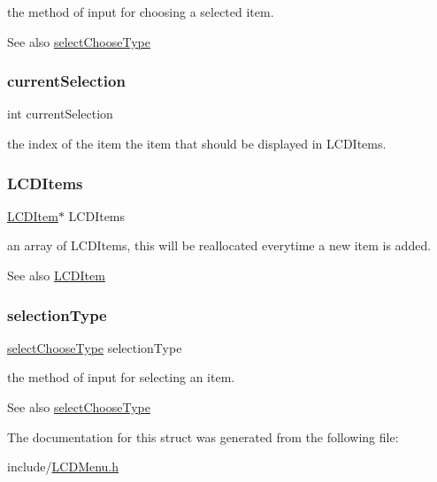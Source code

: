 the method of input for choosing a selected item.

\begin{DoxySeeAlso}{See also}
\hyperlink{_l_c_d_menu_8h_a70536180beac160b7989181e2b242de5}{select\+Choose\+Type} 
\end{DoxySeeAlso}
\hypertarget{struct_l_c_d_menu_a0e589f9054cc1ee0716a7ecda74b1352}{}\label{struct_l_c_d_menu_a0e589f9054cc1ee0716a7ecda74b1352} 
\subsubsection{\texorpdfstring{current\+Selection}{currentSelection}}
{\footnotesize\ttfamily int current\+Selection}

the index of the item the item that should be displayed in L\+C\+D\+Items. \hypertarget{struct_l_c_d_menu_af6fd93180925837331f93529da0f9ce5}{}\label{struct_l_c_d_menu_af6fd93180925837331f93529da0f9ce5} 
\subsubsection{\texorpdfstring{L\+C\+D\+Items}{LCDItems}}
{\footnotesize\ttfamily \hyperlink{struct_l_c_d_item}{L\+C\+D\+Item}$\ast$ L\+C\+D\+Items}

an array of L\+C\+D\+Items, this will be reallocated everytime a new item is added.

\begin{DoxySeeAlso}{See also}
\hyperlink{struct_l_c_d_item}{L\+C\+D\+Item} 
\end{DoxySeeAlso}
\hypertarget{struct_l_c_d_menu_ab58ecc3135bdf1f2198a918c52b3dad6}{}\label{struct_l_c_d_menu_ab58ecc3135bdf1f2198a918c52b3dad6} 
\subsubsection{\texorpdfstring{selection\+Type}{selectionType}}
{\footnotesize\ttfamily \hyperlink{_l_c_d_menu_8h_ac9d30bf238ddf19edf16db21e5362e58}{select\+Choose\+Type} selection\+Type}

the method of input for selecting an item.

\begin{DoxySeeAlso}{See also}
\hyperlink{_l_c_d_menu_8h_a70536180beac160b7989181e2b242de5}{select\+Choose\+Type} 
\end{DoxySeeAlso}


The documentation for this struct was generated from the following file\+:\begin{DoxyCompactItemize}
\item 
include/\hyperlink{_l_c_d_menu_8h}{L\+C\+D\+Menu.\+h}\end{DoxyCompactItemize}
